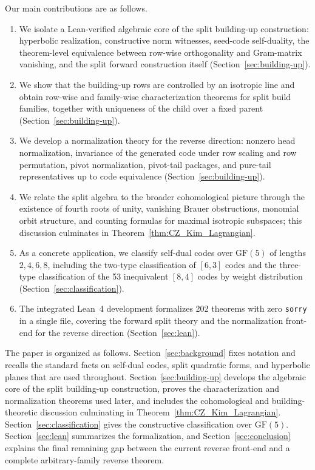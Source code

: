 \documentclass[12pt]{article}
\newcommand{\GF}[1]{\ensuremath{\mathrm{GF}(#1)}}
\begin{document}
Our main contributions are as follows.
\begin{enumerate}[label=(\arabic*)]
\item We isolate a Lean-verified algebraic core of the split building-up construction: hyperbolic realization, constructive norm witnesses, seed-code self-duality, the theorem-level equivalence between row-wise orthogonality and Gram-matrix vanishing, and the split forward construction itself (Section~\ref{sec:building-up}).
\item We show that the building-up rows are controlled by an isotropic line and obtain row-wise and family-wise characterization theorems for split build families, together with uniqueness of the child over a fixed parent (Section~\ref{sec:building-up}).
\item We develop a normalization theory for the reverse direction: nonzero head normalization, invariance of the generated code under row scaling and row permutation, pivot normalization, pivot-tail packages, and pure-tail representatives up to code equivalence (Section~\ref{sec:building-up}).
\item We relate the split algebra to the broader cohomological picture through the existence of fourth roots of unity, vanishing Brauer obstructions, monomial orbit structure, and counting formulas for maximal isotropic subspaces; this discussion culminates in Theorem~\ref{thm:CZ_Kim_Lagrangian}.
\item As a concrete application, we classify self-dual codes over $\GF{5}$ of lengths $2,4,6,8$, including the two-type classification of $[6,3]$ codes and the three-type classification of the 53 inequivalent $[8,4]$ codes by weight distribution (Section~\ref{sec:classification}).
\item The integrated Lean~4 development formalizes 202 theorems with zero \texttt{sorry} in a single file, covering the forward split theory and the normalization front-end for the reverse direction (Section~\ref{sec:lean}).
\end{enumerate}

The paper is organized as follows. Section~\ref{sec:background} fixes notation and recalls the standard facts on self-dual codes, split quadratic forms, and hyperbolic planes that are used throughout. Section~\ref{sec:building-up} develops the algebraic core of the split building-up construction, proves the characterization and normalization theorems used later, and includes the cohomological and building-theoretic discussion culminating in Theorem~\ref{thm:CZ_Kim_Lagrangian}. Section~\ref{sec:classification} gives the constructive classification over $\GF{5}$. Section~\ref{sec:lean} summarizes the formalization, and Section~\ref{sec:conclusion} explains the final remaining gap between the current reverse front-end and a complete arbitrary-family reverse theorem.
\end{document}
